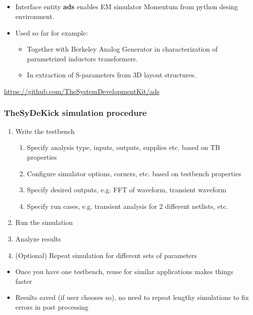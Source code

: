 \documentclass{sdkslides}
\newcommand{\sectname}{Section Name}
\begin{document}
\subsection*{\sectionname}
\begin{frame}[t]
    \frametitle{\sectionname}
    \begin{itemize}
        \item Interface entity \textbf{ads} enables EM simulator Momentum from python desing
            environment.
        \item Used so far for example:
            \begin{itemize}
                \item Together with Berkeley Analog Generator in
                    characterization of parametrized inductors transformers.
                \item In extraction of S-parameters from 3D layout structures.
            \end{itemize}
    \end{itemize}
    { \tiny \url{https://github.com/TheSystemDevelopmentKit/ads}}
\end{frame}
\renewcommand{\sectname}{TheSyDeKick simulation procedure}
\begin{frame}[t]
    \frametitle{\sectname}
        \begin{enumerate}
            \item Write the testbench
            \begin{enumerate}
                \item Specify analysis type, inputs, outputs, supplies etc. based on TB properties
                \item Configure simulator options, corners, etc. based on
                    testbench properties
                \item Specify desired outputs, e.g. FFT of waveform, transient waveform
                \item Specify run cases, e.g. transient analysis for 2 different netlists, etc.
            \end{enumerate}
            \item Run the simulation
            \item Analyze results
            \item (Optional) Repeat simulation for different sets of parameters
        \end{enumerate}
        \begin{itemize}
            \item Once you have one testbench, reuse for similar applications makes things faster
            \item Results saved (if user chooses so), no need to repeat lengthy simulations to fix errors in post processing
        \end{itemize}
\end{frame}
\end{document}
